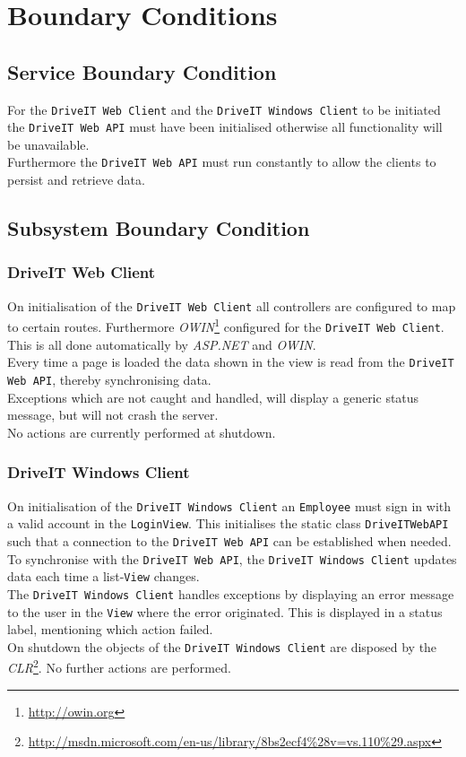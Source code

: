 \section{Boundary Conditions}
\subsection{Service Boundary Condition}
For the \texttt{DriveIT Web Client} and the \texttt{DriveIT Windows Client} to be initiated the \texttt{DriveIT Web API} must have been initialised otherwise all functionality will be unavailable. \\

Furthermore the \texttt{DriveIT Web API} must run constantly to allow the clients to persist and retrieve data.

\subsection{Subsystem Boundary Condition}
\subsubsection{DriveIT Web Client}
On initialisation of the \texttt{DriveIT Web Client} all controllers are configured to map to certain routes. Furthermore \textit{OWIN}\footnote{\url{http://owin.org}} configured for the \texttt{DriveIT Web Client}. This is all done automatically by \textit{ASP.NET} and \textit{OWIN}. \\

Every time a page is loaded the data shown in the view is read from the \texttt{DriveIT Web API}, thereby synchronising data.\\

Exceptions which are not caught and handled, will display a generic status message, but will not crash the server.\\

No actions are currently performed at shutdown.

\subsubsection{DriveIT Windows Client}
On initialisation of the \texttt{DriveIT Windows Client} an \texttt{Employee} must sign in with a valid account in the \texttt{LoginView}. This initialises the static class \texttt{DriveITWebAPI} such that a connection to the \texttt{DriveIT Web API} can be established when needed.\\

To synchronise with the \texttt{DriveIT Web API}, the \texttt{DriveIT Windows Client} updates data each time a list-\texttt{View} changes.\\

The \texttt{DriveIT Windows Client} handles exceptions by displaying an error message to the user in the \texttt{View} where the error originated. This is displayed in a status label, mentioning which action failed.\\

On shutdown the objects of the \texttt{DriveIT Windows Client} are disposed by the \textit{CLR}\footnote{\url{http://msdn.microsoft.com/en-us/library/8bs2ecf4\%28v=vs.110\%29.aspx}}. No further actions are performed.